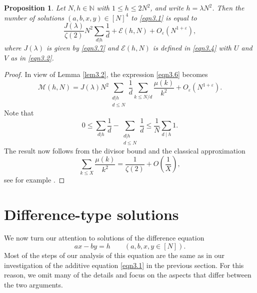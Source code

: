 \documentclass[12pt,reqno]{amsart}
\newtheorem{proposition}[theorem]{Proposition}
\theoremstyle{definition}
\theoremstyle{remark}
\numberwithin{equation}{section}
\def\eps{\varepsilon}
\def \cE {\mathcal E}
\def \cM {\mathcal M}
\def \N {\mathbb{N}}
\newcommand\1{\mathds{1}}
\begin{document}
\begin{proposition}\label{prop3.3}
    Let $N,h\in\N$ with $1\leqslant h\leqslant 2N^2$, and write $h=\lambda N^2$. Then the number of solutions $(a,b,x,y)\in[N]^4$ to \eqref{eqn3.1} is equal to
    \begin{equation*}
        \frac {J(\lambda)}{\zeta(2)}N^2\sum_{d|h}\frac{1}{d} + \cE(h,N)+O_\eps(N^{1+\eps}),
    \end{equation*}
    where $J(\lambda)$ is given by \eqref{eqn3.7} and  $\cE(h,N)$ is defined in \eqref{eqn3.4} with $U$ and $V$ as in \eqref{eqn3.2}.
\end{proposition}
\begin{proof}
    In view of Lemma \ref{lem3.2}, the expression \eqref{eqn3.6} becomes
    \begin{equation*}
        \cM(h,N)= J(\lambda)N^2\sum_{\substack{d|h \\ d\leqslant N}}\frac{1}{d}\sum_{k\leqslant N/d}\frac{\mu(k)}{k^2} + O_\eps(N^{1+\eps}).
    \end{equation*}
    Note that
    \begin{equation*}
       0\leqslant  \sum_{d|h}\frac{1}{d} - \sum_{\substack{d|h \\ d\leqslant N}}\frac{1}{d} \leqslant \frac{1}{N}\sum_{d\mid h}1.
    \end{equation*}
    The result now follows from the divisor bound and the classical approximation
    \begin{equation*}
        \sum_{k\leqslant X}\frac{\mu(k)}{k^2} = \frac{1}{\zeta(2)} + O\left(\frac{1}{X}\right),
    \end{equation*}
    see for example \cite[\S 3.7]{Ap1976}.
\end{proof}

\section{Difference-type solutions}\label{sec4}

We now turn our attention to solutions of the difference equation
\begin{equation}\label{eqn4.1}
    ax - by = h\qquad (a,b,x,y\in[N]).
\end{equation}
Most of the steps of our analysis of this equation are the same as in our investigation of the additive equation \eqref{eqn3.1} in the previous section. For this reason, we omit many of the details and focus on the aspects that differ between the two arguments.
\end{document}
